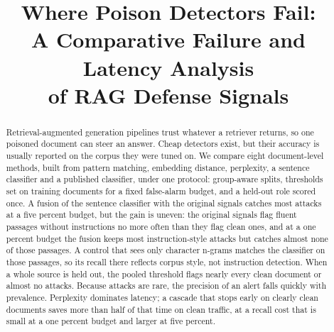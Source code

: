 \documentclass[conference]{IEEEtran}
\begin{document}
\title{Where Poison Detectors Fail:\\
A Comparative Failure and Latency Analysis\\
of RAG Defense Signals}
\author{
\and
{}
\and
{}
}

\maketitle

\begin{abstract}
Retrieval-augmented generation pipelines trust whatever a retriever returns, so one
poisoned document can steer an answer. Cheap detectors exist, but their accuracy is
usually reported on the corpus they were tuned on. We compare eight document-level
methods, built from pattern matching, embedding distance, perplexity, a sentence
classifier and a published classifier, under one protocol: group-aware splits,
thresholds set on training documents for a fixed false-alarm budget, and a held-out
role scored once. A fusion of the sentence classifier with the original signals
catches most attacks at a five percent budget, but the gain is uneven: the original
signals flag fluent passages without instructions no more often than they flag clean
ones, and at a one percent budget the fusion keeps most instruction-style attacks but
catches almost none of those passages. A control that sees only character n-grams
matches the classifier on those passages, so its recall there reflects corpus style,
not instruction detection. When a whole source is held out, the pooled threshold
flags nearly every clean document or almost no attacks. Because attacks are rare,
the precision of an alert falls quickly with prevalence. Perplexity dominates
latency; a cascade that stops early on clearly clean documents saves more than half
of that time on clean traffic, at a recall cost that is small at a one percent budget
and larger at five percent.
\end{abstract}
\end{document}
